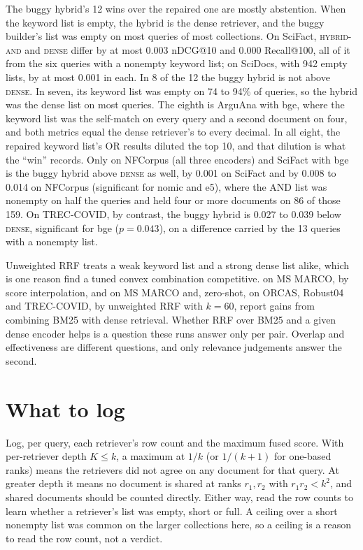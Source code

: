 \documentclass[11pt]{article}
\begin{document}
The buggy hybrid's 12 wins over the repaired one are mostly abstention. When the keyword list is empty, the hybrid is the dense retriever, and the buggy builder's list was empty on most queries of most collections. On SciFact, \textsc{hybrid-and} and \textsc{dense} differ by at most 0.003 nDCG@10 and 0.000 Recall@100, all of it from the six queries with a nonempty keyword list; on SciDocs, with 942 empty lists, by at most 0.001 in each. In 8 of the 12 the buggy hybrid is not above \textsc{dense}. In seven, its keyword list was empty on 74 to 94\% of queries, so the hybrid was the dense list on most queries. The eighth is ArguAna with bge, where the keyword list was the self-match on every query and a second document on four, and both metrics equal the dense retriever's to every decimal. In all eight, the repaired keyword list's OR results diluted the top 10, and that dilution is what the ``win'' records. Only on NFCorpus (all three encoders) and SciFact with bge is the buggy hybrid above \textsc{dense} as well, by 0.001 on SciFact and by 0.008 to 0.014 on NFCorpus (significant for nomic and e5), where the AND list was nonempty on half the queries and held four or more documents on 86 of those 159. On TREC-COVID, by contrast, the buggy hybrid is 0.027 to 0.039 below \textsc{dense}, significant for bge ($p = 0.043$), on a difference carried by the 13 queries with a nonempty list.

Unweighted RRF treats a weak keyword list and a strong dense list alike, which is one reason \citet{bruch2023fusion} find a tuned convex combination competitive. \citet{wang2021interpolation} on MS MARCO, by score interpolation, and \citet{chen2022hybrid} on MS MARCO and, zero-shot, on ORCAS, Robust04 and TREC-COVID, by unweighted RRF with $k = 60$, report gains from combining BM25 with dense retrieval. Whether RRF over BM25 and a given dense encoder helps is a question these runs answer only per pair. Overlap and effectiveness are different questions, and only relevance judgements answer the second.

\section{What to log}
\label{sec:log}

Log, per query, each retriever's row count and the maximum fused score. With per-retriever depth $K \le k$, a maximum at $1/k$ (or $1/(k+1)$ for one-based ranks) means the retrievers did not agree on any document for that query. At greater depth it means no document is shared at ranks $r_1, r_2$ with $r_1 r_2 < k^2$, and shared documents should be counted directly. Either way, read the row counts to learn whether a retriever's list was empty, short or full. A ceiling over a short nonempty list was common on the larger collections here, so a ceiling is a reason to read the row count, not a verdict.
\end{document}
